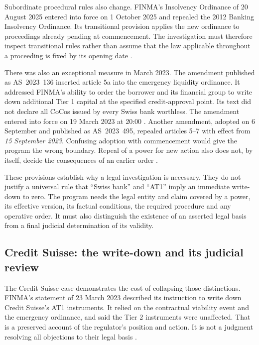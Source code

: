 Subordinate procedural rules also change. FINMA's Insolvency Ordinance of
20 August 2025 entered into force on 1 October 2025 and repealed the 2012
Banking Insolvency Ordinance. Its transitional provision applies the new
ordinance to proceedings already pending at commencement. The investigation
must therefore inspect transitional rules rather than assume that the law
applicable throughout a proceeding is fixed by its opening date
\citep[arts.~1--2 and 48--50]{swissinsolvency2025}.

There was also an exceptional measure in March 2023. The amendment published
as AS~2023~136 inserted article 5a into the emergency liquidity ordinance.
It addressed FINMA's ability to order the borrower and its financial group to
write down additional Tier 1 capital at the specified credit-approval point.
Its text did not declare all CoCos issued by every Swiss bank worthless.
The amendment entered into force on 19 March 2023 at 20:00
\citep[art.~5a and commencement provision]{swissemergency2023}. Another amendment,
adopted on 6 September and published as AS~2023~495, repealed articles 5--7
with effect from \emph{15 September 2023}. Confusing adoption with commencement
would give the program the wrong boundary. Repeal of a power for new action
also does not, by itself, decide the consequences of an earlier order
\citep[repeals and commencement provision]{swissrepeal2023}.

These provisions establish why a legal investigation is necessary. They do not
justify a universal rule that ``Swiss bank'' and ``AT1'' imply an immediate
write-down to zero. The program needs the legal entity and claim covered by a
power, its effective version, its factual conditions, the required procedure
and any operative order. It must also distinguish the existence of an asserted
legal basis from a final judicial determination of its validity.

\subsection{Credit Suisse: the write-down and its judicial review}

The Credit Suisse case demonstrates the cost of collapsing those distinctions.
FINMA's statement of 23 March 2023 described its instruction to write down
Credit Suisse's AT1 instruments. It relied on the contractual viability event
and the emergency ordinance, and said the Tier 2 instruments were unaffected.
That is a preserved account of the regulator's position and action. It is not
a judgment resolving all objections to their legal basis
\citep{finmaat12023}.

